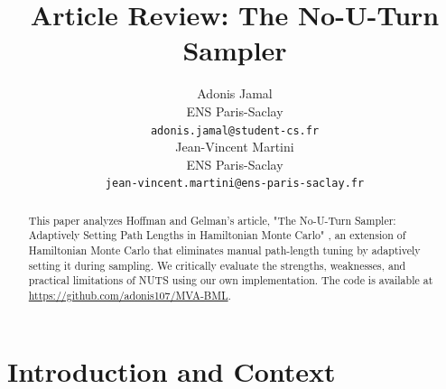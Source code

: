 \documentclass{article}
\title{Article Review: The No-U-Turn Sampler}
\author{%
  Adonis Jamal \\
  ENS Paris-Saclay \\
  \texttt{\small adonis.jamal@student-cs.fr}\\
  \And
  Jean-Vincent Martini \\ 
  ENS Paris-Saclay \\
  \texttt{\small jean-vincent.martini@ens-paris-saclay.fr} \\
}
\begin{document}
\maketitle


\begin{abstract}
  This paper analyzes Hoffman and Gelman's article, "The No-U-Turn Sampler: Adaptively Setting Path Lengths in Hamiltonian Monte Carlo" \cite{main}, an extension of Hamiltonian Monte Carlo that eliminates manual path-length tuning by adaptively setting it during sampling. We critically evaluate the strengths, weaknesses, and practical limitations of NUTS using our own implementation. The code is available at \url{https://github.com/adonis107/MVA-BML}.
\end{abstract}

\vspace*{-1cm}

\section{Introduction and Context}
\end{document}
